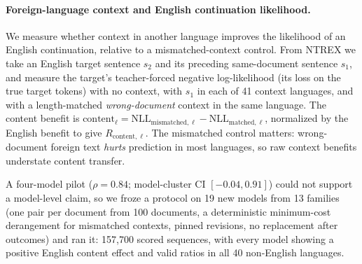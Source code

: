 \documentclass{article} %
\begin{document}
\paragraph{Foreign-language context and English continuation likelihood.} We
measure whether context in another language improves the likelihood of an
English continuation, relative to a mismatched-context control. From NTREX we take an English target
sentence $s_2$ and its preceding same-document sentence $s_1$, and measure the
target's teacher-forced negative log-likelihood (its loss on the true target tokens) with no context, with $s_1$ in
each of 41 context languages, and with a length-matched \emph{wrong-document}
context in the same language. The content benefit is
$\mathrm{content}_\ell = \mathrm{NLL}_{\mathrm{mismatched},\ell} - \mathrm{NLL}_{\mathrm{matched},\ell}$,
normalized by the English benefit to give $R_{\mathrm{content},\ell}$. The mismatched control matters: wrong-document foreign text \emph{hurts} prediction in most languages, so raw context benefits understate content transfer.

A four-model pilot ($\rho = 0.84$; model-cluster CI $[-0.04, 0.91]$) could not support a model-level claim, so we froze a protocol on 19 new models from 13 families (one pair per
document from 100 documents, a deterministic minimum-cost derangement for
mismatched contexts, pinned revisions, no replacement after outcomes) and ran
it: 157,700 scored sequences, with every model showing a positive English
content effect and valid ratios in all 40 non-English languages.
\end{document}
